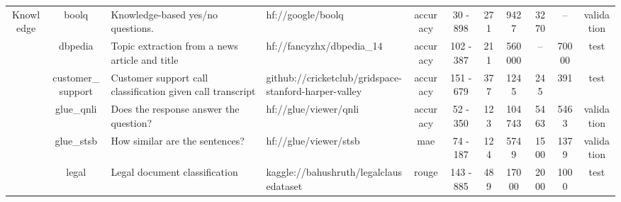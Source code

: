 \begin{landscape}
\begin{table}[ht]
{\begin{tabular}{ccllccccccc}
\midrule
\multirow{8}{*}{Knowledge}         & boolq                               & Knowledge-based yes/no questions.                                     & hf://google/boolq                                            & accuracy                         & 30 - 898                                  & 271                                     & 9427           & 3270                & --            & validation                                                              \\
                                   & dbpedia                             & Topic extraction from a news article and title                        & hf://fancyzhx/dbpedia\_14                                    & accuracy                         & 102 - 387                                 & 211                                     & 560000         & --                  & 70000         & test                                                                    \\
                                   & customer\_support                   & Customer support call classification given call transcript            & github://cricketclub/gridspace-stanford-harper-valley        & accuracy                         & 151 - 679                                 & 377                                     & 1245           & 245                 & 391           & test                                                                    \\
                                   & glue\_qnli                          & Does the response answer the question?                                & hf://glue/viewer/qnli                                        & accuracy                         & 52 - 350                                  & 123                                     & 104743         & 5463                & 5463          & validation                                                              \\
                                   & glue\_stsb                          & How similar are the sentences?                                        & hf://glue/viewer/stsb                                        & mae                              & 74 - 187                                  & 124                                     & 5749           & 1500                & 1379          & validation                                                              \\
                                   & legal                               & Legal document classification                                         & kaggle://bahushruth/legalclausedataset                       & rouge                            & 143 - 885                                 & 489                                     & 17000          & 2000                & 1000          & test                                                                    \\

\end{tabular}}
\end{table}
\end{landscape}
